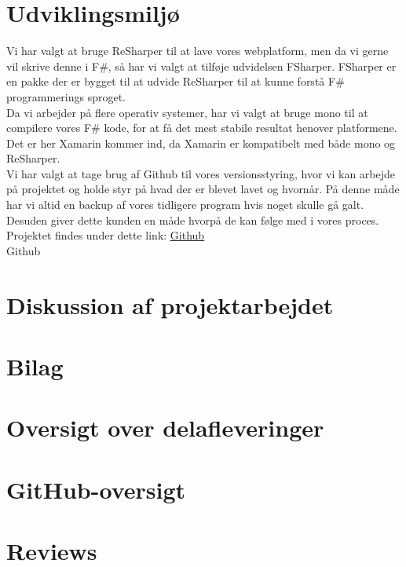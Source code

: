 \documentclass[12pt, a4paper]{article}
\begin{document}
\section{Udviklingsmiljø}

Vi har valgt at bruge ReSharper til at lave vores webplatform, men da vi gerne vil skrive denne i F\#, så har vi valgt at tilføje udvidelsen FSharper. FSharper er en pakke der er bygget til at udvide ReSharper til at kunne forstå F\# programmerings sproget. \\

Da vi arbejder på flere operativ systemer, har vi valgt at bruge mono til at compilere vores F\# kode, for at få det mest stabile resultat henover platformene. Det er her Xamarin kommer ind, da Xamarin er kompatibelt med både mono og ReSharper. \\

Vi har valgt at tage brug af Github til vores versionsstyring, hvor vi kan arbejde på projektet og holde styr på hvad der er blevet lavet og hvornår. På denne måde har vi altid en backup af vores tidligere program hvis noget skulle gå galt. Desuden giver dette kunden en måde hvorpå de kan følge med i vores proces. \\
Projektet findes under dette link: \href{https://github.com/Ambrodji/SU-MMJ}{Github}\\
Github \checkmark

\section{Diskussion af projektarbejdet}



\section*{Bilag}

\section{Oversigt over delafleveringer}
\label{bilag:delafleveringer}

\section{GitHub-oversigt}
\label{bilag:github}

\section{Reviews}
\label{bilag:reviews}
\end{document}
